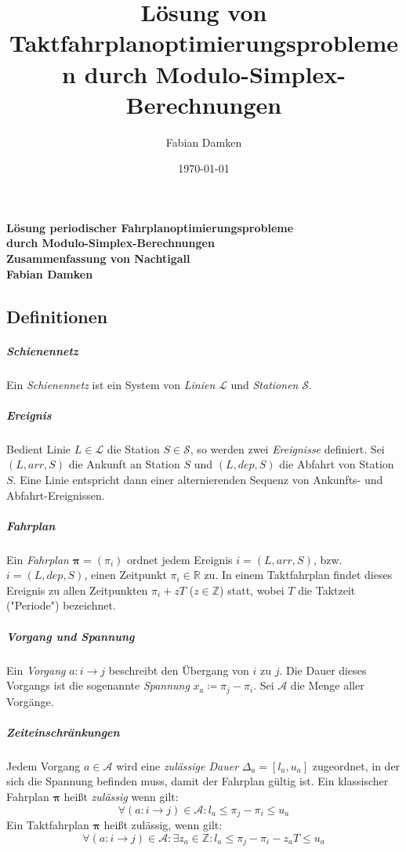 \documentclass[a4paper, 10pt, twocolumn]{scrartcl}
\title{Lösung von Taktfahrplanoptimierungsproblemen durch Modulo-Simplex-Berechnungen}
\author{Fabian Damken}
\date{\today}
\newcommand{\arr}{\mathit{arr}}
\newcommand{\dep}{\mathit{dep}}
\newcommand{\R}{\ensuremath{\mathbb{R}}}
\newcommand{\Z}{\ensuremath{\mathbb{Z}}}
\renewcommand{\vec}[1]{\boldsymbol{#1}}
\newcommand{\bzw}{bzw.~}
\begin{document}
	

	\makeatletter
	\begin{center}
		\textbf{\Large Lösung periodischer \mbox{Fahrplanoptimierungsprobleme} \\ \vspace{2mm} durch Modulo-Simplex-Berechnungen} \\ \vspace{2mm}
		\textbf{\large Zusammenfassung von Nachtigall} \\ \vspace{3mm}
		\textbf{\large Fabian Damken} \\ \vspace{1mm}
		{\large \@date}
	\end{center}
	\makeatother

	\subsection*{Definitionen}
		\subparagraph{Schienennetz}
		Ein \emph{Schienennetz} ist ein System von \emph{Linien} \(\mathcal{L}\) und \emph{Stationen} \(\mathcal{S}\).
	
		\subparagraph{Ereignis}
		Bedient Linie \( L \in \mathcal{L} \) die Station \( S \in \mathcal{S} \), so werden zwei \emph{Ereignisse} definiert. Sei \( (L, \arr, S) \) die Ankunft an Station \(S\) und \( (L, \dep, S) \) die Abfahrt von Station \(S\). Eine Linie entspricht dann einer alternierenden Sequenz von Ankunfts- und Abfahrt-Ereignissen.
	
		\subparagraph{Fahrplan}
		Ein \emph{Fahrplan} \( \vec{\pi} = (\pi_i) \) ordnet jedem Ereignis \( i = (L, \arr, S) \), \bzw \( i = (L, \dep, S) \), einen Zeitpunkt \( \pi_i \in \R \) zu. In einem Taktfahrplan findet dieses Ereignis zu allen Zeitpunkten \( \pi_i + z T \) (\( z \in \Z \)) statt, wobei \( T \) die Taktzeit ("Periode") bezeichnet.
		
		\subparagraph{Vorgang und Spannung}
		Ein \emph{Vorgang} \( a : i \to j \) beschreibt den Übergang von \(i\) zu \(j\). Die Dauer dieses Vorgangs ist die sogenannte \emph{Spannung} \( x_a \coloneqq \pi_j - \pi_i \). Sei \(\mathcal{A}\) die Menge aller Vorgänge.
		
		\subparagraph{Zeiteinschränkungen}
		Jedem Vorgang \( a \in \mathcal{A} \) wird eine \emph{zulässige Dauer} \( \Delta_a = [l_a, u_a] \) zugeordnet, in der sich die Spannung befinden muss, damit der Fahrplan gültig ist. Ein klassischer Fahrplan \(\vec{\pi}\) heißt \emph{zulässig} wenn gilt:
		\begin{equation*}
			\forall (a : i \to j) \in \mathcal{A} : l_a \leq \pi_j - \pi_i \leq u_a
		\end{equation*}
		Ein Taktfahrplan \( \vec{\pi} \) heißt zulässig, wenn gilt:
		\begin{equation*}
			\forall (a : i \to j) \in \mathcal{A} : \exists z_a \in \Z : l_a \leq \pi_j - \pi_i - z_a T \leq u_a
		\end{equation*}
		
\end{document}
